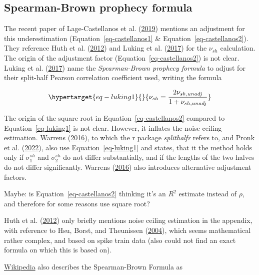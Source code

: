 \documentclass[
  letterpaper,
  DIV=11,
  numbers=noendperiod]{scrartcl}
\begin{document}
\hypertarget{sec-adj-sb}{%
\subsection{Spearman-Brown prophecy formula}\label{sec-adj-sb}}

The recent paper of Lage-Castellanos et al.
(\protect\hyperlink{ref-lage-castellanos2019}{2019}) mentions an
adjustment for this underestimation (Equation~\ref{eq-castellanos1} \&
Equation~\ref{eq-castellanos2}). They reference Huth et al.
(\protect\hyperlink{ref-huth2012}{2012}) and Luking et al.
(\protect\hyperlink{ref-luking2017}{2017}) for the \(\nu_{sh}\)
calculation. The origin of the adjustment factor
(Equation~\ref{eq-castellanos2}) is not clear. Luking et al.
(\protect\hyperlink{ref-luking2017}{2017}) name the \emph{Spearman-Brown
prophecy formula} to adjust for their split-half Pearson correlation
coefficient used, writing the formula

\begin{equation}\protect\hypertarget{eq-luking1}{}{
\nu_{sh} = \dfrac{2 \nu_{sh,unadj}}{1+ \nu_{sh,unadj}}
}\label{eq-luking1}\end{equation}

The origin of the square root in Equation~\ref{eq-castellanos2} compared
to Equation~\ref{eq-luking1} is not clear. However, it inflates the
noise ceiling estimation. Warrens
(\protect\hyperlink{ref-warrens2016}{2016}), to which the r package
\emph{splithalfr} refers to, and Pronk et al.
(\protect\hyperlink{ref-pronk2022}{2022}), also use
Equation~\ref{eq-luking1} and states, that it the method holds only if
\(\sigma_1^{sh}\) and \(\sigma_2^{sh}\) do not differ substantially, and
if the lengths of the two halves do not differ significantly. Warrens
(\protect\hyperlink{ref-warrens2016}{2016}) also introduces alternative
adjustment factors.

Maybe: is Equation~\ref{eq-castellanos2} thinking it's an \(R^2\)
estimate instead of \(\rho\), and therefore for some reasons use square
root?

Huth et al. (\protect\hyperlink{ref-huth2012}{2012}) only briefly
mentions noise ceiling estimation in the appendix, with reference to
Hsu, Borst, and Theunissen (\protect\hyperlink{ref-hsu2004}{2004}),
which seems mathematical rather complex, and based on spike train data
(also could not find an exact formula on which this is based on).

\href{https://en.wikipedia.org/wiki/Spearman–Brown_prediction_formula}{Wikipedia}
also describes the Spearman-Brown Formula as
\end{document}
